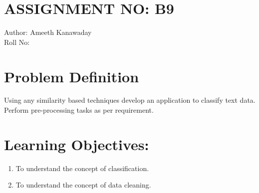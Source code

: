 \documentclass[10pt,a4paper]{article}
\begin{document}
\section{ASSIGNMENT NO: B9}
Author:\:   Ameeth Kanawaday\\
Roll No:\\
\section{Problem Definition}
Using any similarity based techniques develop an application to classify text data. Perform pre-processing tasks as per requirement.

\section{Learning Objectives:}
\begin{enumerate}
\item To understand the concept of classification.
\item To understand the concept of data cleaning.
\end{enumerate}
\end{document}
